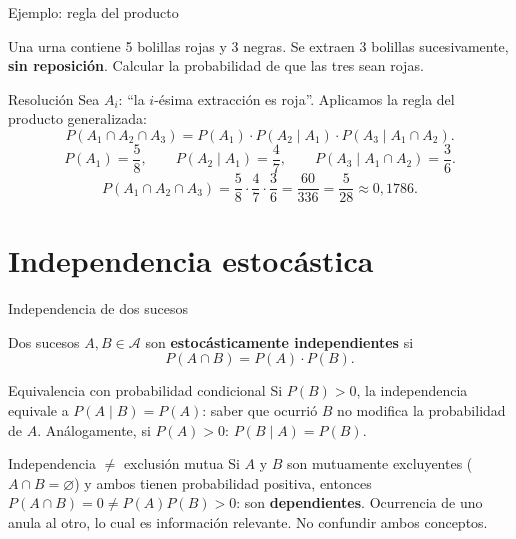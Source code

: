 \documentclass[aspectratio=169,11pt]{beamer}
\begin{document}
\begin{frame}{Ejemplo: regla del producto}
\begin{example}
Una urna contiene 5 bolillas rojas y 3 negras. Se extraen 3 bolillas sucesivamente, \textbf{sin reposición}. Calcular la probabilidad de que las tres sean rojas.
\end{example}
\begin{block}{Resolución}
Sea $A_i$: ``la $i$-ésima extracción es roja''. Aplicamos la regla del producto generalizada:
\[
P(A_1\cap A_2\cap A_3) = P(A_1)\cdot P(A_2\mid A_1)\cdot P(A_3\mid A_1\cap A_2).
\]
\[
P(A_1) = \frac{5}{8}, \qquad P(A_2\mid A_1) = \frac{4}{7}, \qquad P(A_3\mid A_1\cap A_2) = \frac{3}{6}.
\]
\[
P(A_1\cap A_2\cap A_3) = \frac{5}{8}\cdot\frac{4}{7}\cdot\frac{3}{6} = \frac{60}{336} = \frac{5}{28} \approx 0{,}1786.
\]
\end{block}
\end{frame}

\section{Independencia estocástica}

\begin{frame}{Independencia de dos sucesos}
\begin{definition}
Dos sucesos $A, B \in \mathcal{A}$ son \textbf{estocásticamente independientes} si
\[
P(A\cap B) = P(A)\cdot P(B).
\]
\end{definition}
\begin{block}{Equivalencia con probabilidad condicional}
Si $P(B)>0$, la independencia equivale a $P(A\mid B) = P(A)$: saber que ocurrió $B$ no modifica la probabilidad de $A$. Análogamente, si $P(A)>0$: $P(B\mid A)=P(B)$.
\end{block}
\begin{alertblock}{Independencia $\neq$ exclusión mutua}
Si $A$ y $B$ son mutuamente excluyentes ($A\cap B=\varnothing$) y ambos tienen probabilidad positiva, entonces $P(A\cap B)=0 \neq P(A)P(B) > 0$: son \textbf{dependientes}. Ocurrencia de uno anula al otro, lo cual es información relevante. No confundir ambos conceptos.
\end{alertblock}
\end{frame}
\end{document}
